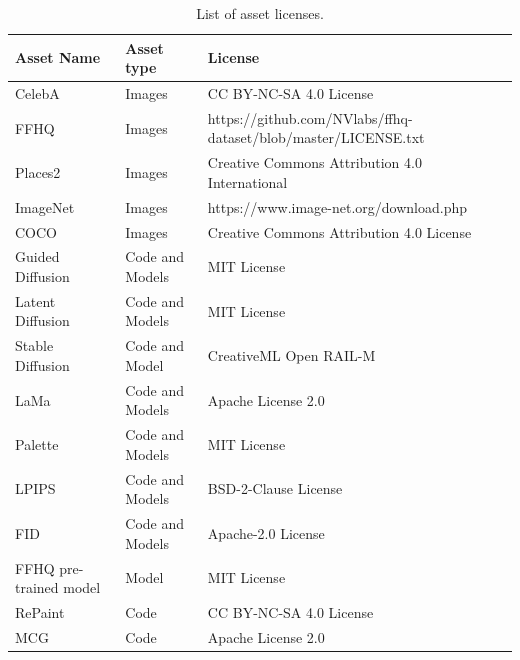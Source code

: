 \begin{table}[h]
\hspace{\sizeforappendix}
\footnotesize
\begin{tabular}{lll}
\toprule
\textbf{Asset Name} & \textbf{Asset type} & \textbf{License} \\
\midrule
CelebA & Images & CC BY-NC-SA 4.0 License \\
FFHQ & Images &  https://github.com/NVlabs/ffhq-dataset/blob/master/LICENSE.txt \\
Places2 &  Images & Creative Commons Attribution 4.0 International \\
ImageNet & Images & https://www.image-net.org/download.php \\
COCO & Images & Creative Commons Attribution 4.0 License \\
Guided Diffusion & Code and Models & MIT License\\
Latent Diffusion & Code and Models & MIT License \\
Stable Diffusion & Code and Model & CreativeML Open RAIL-M\\
LaMa & Code and Models & Apache License 2.0 \\
Palette & Code and Models & MIT License \\
LPIPS & Code and Models & BSD-2-Clause License \\
FID & Code and Models & Apache-2.0 License \\
FFHQ pre-trained model & Model & MIT License \\%
RePaint & Code & CC BY-NC-SA 4.0 License\\
MCG & Code & Apache License 2.0\\
\bottomrule
\end{tabular}
\caption{List of asset licenses.}
\label{tab:licenceschap3}
\end{table}